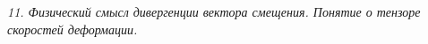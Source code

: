 \emph{11. Физический смысл дивергенции вектора смещения. Понятие о тензоре
скоростей деформации.}

\newpage
